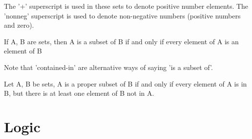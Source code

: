 

The '+' superscript is used in these sets to denote positive number elements.
The 'nonneg' superscript is used to denote non-negative numbers (positive numbers and zero).


\begin{definition}\label{def:subset-txt}
If A, B are sets, then A is a subset of B if and only if every element of A is an element of B
\end{definition}


Note that 'contained-in' are alternative ways of saying 'is a subset of'.

\begin{definition}\label{def:proper-subset-txt}
Let A, B be sets, A is a proper subset of B if and only if every element of A is in B, but there
is at least one element of B not in A.
\end{definition}



\section{Logic}







